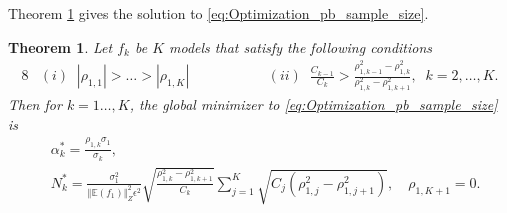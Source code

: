 \documentclass[final,3p,times,11pt]{elsarticle}
\newtheorem{theorem}{Theorem}%
\begin{document}
Theorem \ref{thm:Sample_size_est} gives the solution to \eqref{eq:Optimization_pb_sample_size}.
\begin{theorem}
\label{thm:Sample_size_est}
Let $f_k$ be $K$ models that satisfy the following conditions
%
\begin{alignat*}{8}
    &(i)\;\; |\rho_{1,1}|>\ldots>|\rho_{1,K}|& \qquad \qquad
    &(ii)\;\; \frac{C_{k-1}}{C_k}>\frac{\rho_{1,k-1}^2-\rho_{1,k}^2}{\rho_{1,k}^2-\rho_{1,k+1}^2},\;\;k=2,\ldots,K.
\end{alignat*}
%
Then for $k=1\ldots, K$, the global minimizer to \eqref{eq:Optimization_pb_sample_size} is 
\begin{align}
    \label{eq:MFMC_coefficients}
    &\alpha_k^*=\frac{\rho_{1,k}\sigma_1}{\sigma_k},\\
    \label{eq:MFMC_SampleSize}
    &N_k^*=\frac{\sigma_1^2}{\left\Vert\mathbb{E}(f_1) \right\Vert_{Z}^2\epsilon^2}\sqrt{\frac{\rho_{1,k}^2-\rho_{1,k+1}^2}{C_k}}\sum_{j=1}^K\sqrt{C_j\left(\rho_{1,j}^2-\rho_{1,j+1}^2\right)}, \quad \rho_{1,K+1}=0.
\end{align}


\end{theorem}
\end{document}

